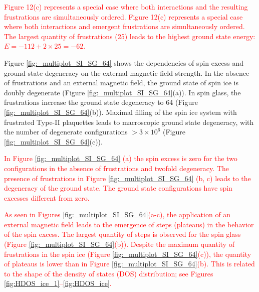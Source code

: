 \documentclass[preprint,12pt]{elsarticle}
\begin{document}
	\textcolor{red}{Figure 12(c) represents a special case where both interactions and the resulting frustrations are simultaneously ordered. Figure 12(c) represents a special case where both interactions and emergent frustrations are simultaneously ordered. The largest quantity of frustrations (25) leads to the highest ground state energy: $E = -112 + 2\times25 = -62$.}
	
	Figure \ref{fig:_multiplot_SI_SG_64} shows the dependencies of spin excess and ground state degeneracy on the external magnetic field strength.
	In the absence of frustrations and an external magnetic field, the ground state of spin ice is doubly degenerate (Figure \ref{fig:_multiplot_SI_SG_64}(a)).
	In spin glass, the frustrations increase the ground state degeneracy to 64 (Figure \ref{fig:_multiplot_SI_SG_64}(b)).
	Maximal filling of the spin ice system with frustrated Type-II plaquettes leads to macroscopic ground state degeneracy, with the number of degenerate configurations $> 3\times10^{6}$ (Figure \ref{fig:_multiplot_SI_SG_64}(c)).
	
	\textcolor{red}{In Figure \ref{fig:_multiplot_SI_SG_64} (a) the spin excess is zero for the two configurations in the absence of frustrations and twofold degeneracy. The presence of frustrations in Figure \ref{fig:_multiplot_SI_SG_64} (b, c) leads to the degeneracy of the ground state. The ground state configurations have spin excesses different from zero.}
	
	
	\textcolor{red}{As seen in Figures \ref{fig:_multiplot_SI_SG_64}(a-c), the application of an external magnetic field leads to the emergence of steps (plateaus) in the behavior of the spin excess. The largest quantity of steps is observed for the spin glass (Figure \ref{fig:_multiplot_SI_SG_64}(b)). Despite the maximum quantity of frustrations in the spin ice (Figure \ref{fig:_multiplot_SI_SG_64}(c)), the quantity of plateaus is lower than in Figure \ref{fig:_multiplot_SI_SG_64}(b). This is related to the shape of the density of states (DOS) distribution; see Figures \ref{fig:HDOS_ice_1}–\ref{fig:HDOS_ice}.}
	
\end{document}
